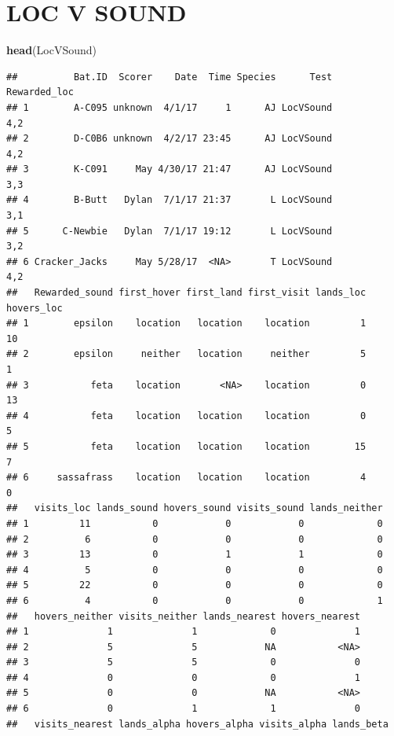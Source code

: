 \documentclass[]{article}
\newenvironment{Shaded}{\begin{snugshade}}{\end{snugshade}}
\newcommand{\KeywordTok}[1]{\textcolor[rgb]{0.13,0.29,0.53}{\textbf{{#1}}}}
\newcommand{\NormalTok}[1]{{#1}}
\begin{document}
\section{LOC V SOUND}\label{loc-v-sound}

\begin{Shaded}
\begin{Highlighting}[]
\KeywordTok{head}\NormalTok{(LocVSound)}
\end{Highlighting}
\end{Shaded}

\begin{verbatim}
##          Bat.ID  Scorer    Date  Time Species      Test Rewarded_loc
## 1        A-C095 unknown  4/1/17     1      AJ LocVSound          4,2
## 2        D-C0B6 unknown  4/2/17 23:45      AJ LocVSound          4,2
## 3        K-C091     May 4/30/17 21:47      AJ LocVSound          3,3
## 4        B-Butt   Dylan  7/1/17 21:37       L LocVSound          3,1
## 5      C-Newbie   Dylan  7/1/17 19:12       L LocVSound          3,2
## 6 Cracker_Jacks     May 5/28/17  <NA>       T LocVSound          4,2
##   Rewarded_sound first_hover first_land first_visit lands_loc hovers_loc
## 1        epsilon    location   location    location         1         10
## 2        epsilon     neither   location     neither         5          1
## 3           feta    location       <NA>    location         0         13
## 4           feta    location   location    location         0          5
## 5           feta    location   location    location        15          7
## 6     sassafrass    location   location    location         4          0
##   visits_loc lands_sound hovers_sound visits_sound lands_neither
## 1         11           0            0            0             0
## 2          6           0            0            0             0
## 3         13           0            1            1             0
## 4          5           0            0            0             0
## 5         22           0            0            0             0
## 6          4           0            0            0             1
##   hovers_neither visits_neither lands_nearest hovers_nearest
## 1              1              1             0              1
## 2              5              5            NA           <NA>
## 3              5              5             0              0
## 4              0              0             0              1
## 5              0              0            NA           <NA>
## 6              0              1             1              0
##   visits_nearest lands_alpha hovers_alpha visits_alpha lands_beta

\end{verbatim}
\end{document}
